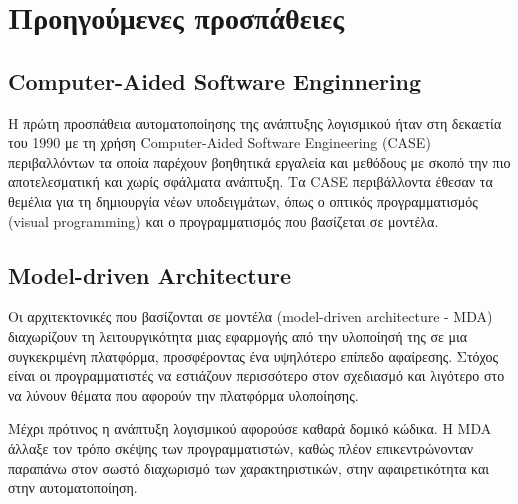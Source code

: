     \section{Προηγούμενες προσπάθειες}
        \subsection{Computer-Aided Software Enginnering}
        Η πρώτη προσπάθεια αυτοματοποίησης της ανάπτυξης λογισμικού ήταν στη δεκαετία του 1990 με τη χρήση Computer-Aided Software Engineering (CASE) περιβαλλόντων  τα οποία παρέχουν βοηθητικά εργαλεία και μεθόδους με σκοπό την πιο αποτελεσματική και χωρίς σφάλματα ανάπτυξη. Τα CASE περιβάλλοντα έθεσαν τα θεμέλια για τη δημιουργία νέων υποδειγμάτων, όπως ο οπτικός προγραμματισμός (visual programming) και ο προγραμματισμός που βασίζεται σε μοντέλα. \cite{Case1985}

        \subsection{Model-driven Architecture}
        Οι αρχιτεκτονικές που βασίζονται σε μοντέλα (model-driven architecture - MDA) διαχωρίζουν τη λειτουργικότητα μιας εφαρμογής από την υλοποίησή της σε μια συγκεκριμένη πλατφόρμα, προσφέροντας ένα υψηλότερο επίπεδο αφαίρεσης. Στόχος είναι οι προγραμματιστές να εστιάζουν περισσότερο στον σχεδιασμό και λιγότερο στο να λύνουν θέματα που αφορούν την πλατφόρμα υλοποίησης.

        Μέχρι πρότινος η ανάπτυξη λογισμικού αφορούσε καθαρά δομικό κώδικα. Η MDA άλλαξε τον τρόπο σκέψης των προγραμματιστών, καθώς πλέον επικεντρώνονταν παραπάνω στον σωστό διαχωρισμό των χαρακτηριστικών, στην αφαιρετικότητα και στην αυτοματοποίηση. \cite{MDAFAQ} \cite{Bucaioni2022}
